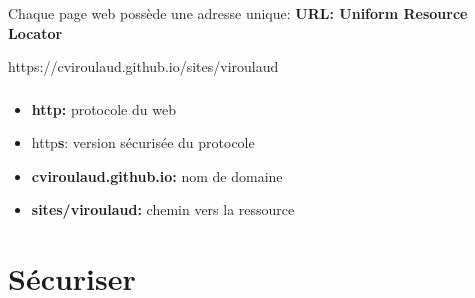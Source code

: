 \documentclass[svgnames,11pt]{beamer}
\begin{document}
\begin{frame}
    \frametitle{}

    Chaque page web possède une adresse unique: \textbf{URL: Uniform Resource Locator}
    \begin{center}
        {\Large https://cviroulaud.github.io/sites/viroulaud}
    \end{center}

\end{frame}
\begin{frame}
    \frametitle{}

    \begin{itemize}
        \item<1-> \textbf{http:} protocole du web
        \item<2-> http\textbf{s}: version sécurisée du protocole
        \item<3-> \textbf{cviroulaud.github.io:} nom de domaine
        \item<4-> \textbf{sites/viroulaud:} chemin vers la ressource
    \end{itemize}

\end{frame}
\section{Sécuriser}
\end{document}

